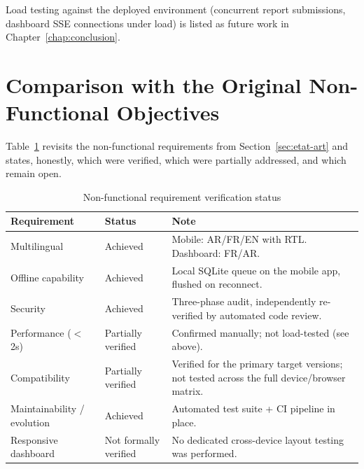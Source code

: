 Load testing against the deployed environment (concurrent report submissions, dashboard SSE connections under load) is listed as future work in Chapter~\ref{chap:conclusion}.

\section{Comparison with the Original Non-Functional Objectives}

Table~\ref{tab:nfr-status} revisits the non-functional requirements from Section~\ref{sec:etat-art} and states, honestly, which were verified, which were partially addressed, and which remain open.

\begin{table}[h!]
\centering
\begin{tabularx}{\textwidth}{lXl}
\toprule
\textbf{Requirement} & \textbf{Status} & \textbf{Note} \\
\midrule
Multilingual         & Achieved & Mobile: AR/FR/EN with RTL. Dashboard: FR/AR. \\
Offline capability   & Achieved & Local SQLite queue on the mobile app, flushed on reconnect. \\
Security             & Achieved & Three-phase audit, independently re-verified by automated code review. \\
Performance ($<$2s)  & Partially verified & Confirmed manually; not load-tested (see above). \\
Compatibility        & Partially verified & Verified for the primary target versions; not tested across the full device/browser matrix. \\
Maintainability / evolution & Achieved & Automated test suite + CI pipeline in place. \\
Responsive dashboard & Not formally verified & No dedicated cross-device layout testing was performed. \\
\bottomrule
\end{tabularx}
\caption{Non-functional requirement verification status}
\label{tab:nfr-status}
\end{table}
